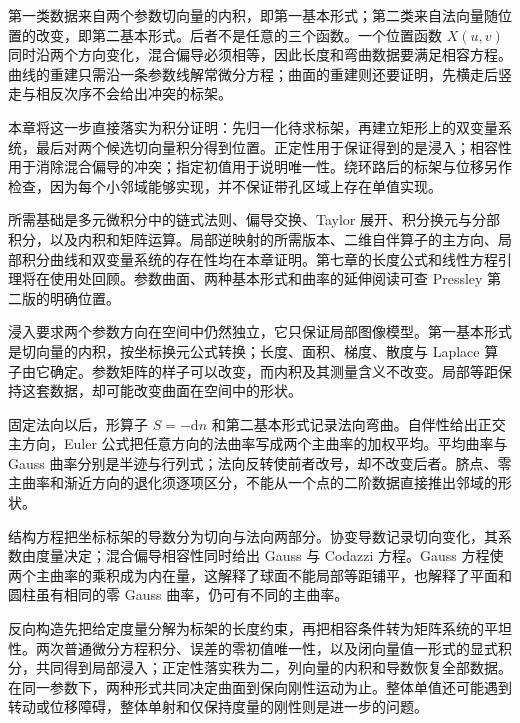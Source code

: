 \ProseParagraphBreak

第一类数据来自两个参数切向量的内积，即第一基本形式；第二类来自法向量随位置的改变，即第二基本形式。后者不是任意的三个函数。一个位置函数 \(X(u,v)\) 同时沿两个方向变化，混合偏导必须相等，因此长度和弯曲数据要满足相容方程。曲线的重建只需沿一条参数线解常微分方程；曲面的重建则还要证明，先横走后竖走与相反次序不会给出冲突的标架。

\ProseParagraphBreak

本章将这一步直接落实为积分证明：先归一化待求标架，再建立矩形上的双变量系统，最后对两个候选切向量积分得到位置。正定性用于保证得到的是浸入；相容性用于消除混合偏导的冲突；指定初值用于说明唯一性。绕环路后的标架与位移另作检查，因为每个小邻域能够实现，并不保证带孔区域上存在单值实现。

\ProseParagraphBreak

所需基础是多元微积分中的链式法则、偏导交换、Taylor 展开、积分换元与分部积分，以及内积和矩阵运算。局部逆映射的所需版本、二维自伴算子的主方向、局部积分曲线和双变量系统的存在性均在本章证明。第七章的长度公式和线性方程引理将在使用处回顾。参数曲面、两种基本形式和曲率的延伸阅读可查 Pressley 第二版的明确位置\cite[第4.1--4.5, 6.1--6.2, 7.1--7.3, 8.1--8.2, 10.1--10.2节]{Pressley2010}。







\begin{chaptersummary}
	浸入要求两个参数方向在空间中仍然独立，它只保证局部图像模型。第一基本形式是切向量的内积，按坐标换元公式转换；长度、面积、梯度、散度与 Laplace 算子由它确定。参数矩阵的样子可以改变，而内积及其测量含义不改变。局部等距保持这套数据，却可能改变曲面在空间中的形状。

	\ProseParagraphBreak

	固定法向以后，形算子 \(S=-\mathrm{d}n\) 和第二基本形式记录法向弯曲。自伴性给出正交主方向，Euler 公式把任意方向的法曲率写成两个主曲率的加权平均。平均曲率与 Gauss 曲率分别是半迹与行列式；法向反转使前者改号，却不改变后者。脐点、零主曲率和渐近方向的退化须逐项区分，不能从一个点的二阶数据直接推出邻域的形状。

	\ProseParagraphBreak

	结构方程把坐标标架的导数分为切向与法向两部分。协变导数记录切向变化，其系数由度量决定；混合偏导相容性同时给出 Gauss 与 Codazzi 方程。Gauss 方程使两个主曲率的乘积成为内在量，这解释了球面不能局部等距铺平，也解释了平面和圆柱虽有相同的零 Gauss 曲率，仍可有不同的主曲率。

	\ProseParagraphBreak

	反向构造先把给定度量分解为标架的长度约束，再把相容条件转为矩阵系统的平坦性。两次普通微分方程积分、误差的零初值唯一性，以及闭向量值一形式的显式积分，共同得到局部浸入；正定性落实秩为二，列向量的内积和导数恢复全部数据。在同一参数下，两种形式共同决定曲面到保向刚性运动为止。整体单值还可能遇到转动或位移障碍，整体单射和仅保持度量的刚性则是进一步的问题。
\end{chaptersummary}

